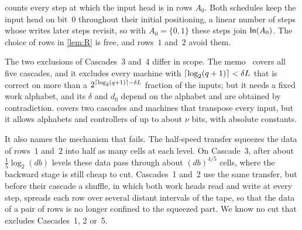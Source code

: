 \begin{remark}\label{rem:cascade-rows}
 counts every step at which the input head is in rows $A_0$. Both schedules keep the input head on bit~$0$ throughout their
initial positioning, a linear number of steps whose writes later steps revisit, so with $A_0=\{0,1\}$ these steps join $\mathsf{In}(A_0)$.
The choice of rows in \cref{lem:R} is free, and rows~$1$ and~$2$ avoid them.
\end{remark}

The two exclusions of Cascades~3 and~4 differ in scope. The memo~\cite{CascadeObstructionMemo2026} covers all five cascades, and it excludes every
machine with $\lceil \log_2 (q+1) \rceil<\delta L$ that is correct on more than a $2^{\lceil \log_2 (q+1) \rceil-\delta L}$ fraction of the inputs; but it needs a
fixed work alphabet, and its $\delta$ and $d_0$ depend on the alphabet and are obtained by contradiction. 
covers two cascades and machines that transpose every input, but it allows alphabets and controllers of up to about $\nu$ bits, with
absolute constants.

It also names the mechanism that fails. The half-speed transfer squeezes the data of rows~$1$ and~$2$ into half as many cells at
each level. On Cascade~3, after about $\frac15\log_2(db)$ levels these data pass through about $(db)^{4/5}$ cells, where the backward
stage is still cheap to cut. Cascades~1 and~2 use the same transfer, but before their cascade a shuffle, in which both work heads read
and write at every step, spreads each row over several distant intervals of the tape, so that the data of a pair of rows is no longer
confined to the squeezed part. We
know no cut that excludes Cascades~1, 2 or~5.
